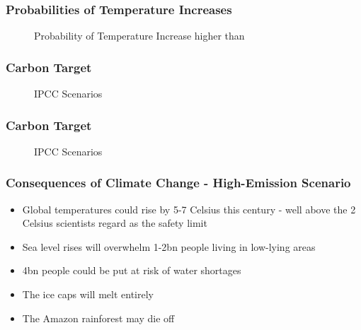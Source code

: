 \begin{frame}
\frametitle{Probabilities of Temperature Increases}
\begin{center}
\begin{figure}[h!]
\centering
{} %
\caption{Probability of Temperature Increase higher than}
\label{fig:temperature}
\end{figure}
\end{center}
\end{frame}

\begin{frame}
\frametitle{Carbon Target}
\begin{center}
\begin{figure}[h!]
\centering
{} %
\caption{IPCC Scenarios}
\label{fig:emissions}
\end{figure}
\end{center}
\end{frame}

\begin{frame}
\frametitle{Carbon Target}
\begin{center}
\begin{figure}[h!]
\centering
{} %
\caption{IPCC Scenarios}
\label{fig:emissions}
\end{figure}
\end{center}
\end{frame}



\begin{frame}
 \frametitle{Consequences of Climate Change - High-Emission Scenario}
\begin{itemize}
\item<1-> Global temperatures could rise by 5-7 Celsius this century - well above the 2 Celsius scientists regard as the safety limit
\item<2-> Sea level rises will overwhelm 1-2bn people living in low-lying areas
\item<3-> 4bn people could be put at risk of water shortages
\item<4-> The ice caps will melt entirely
\item<5-> The Amazon rainforest may die off
\end{itemize}
\end{frame} %

